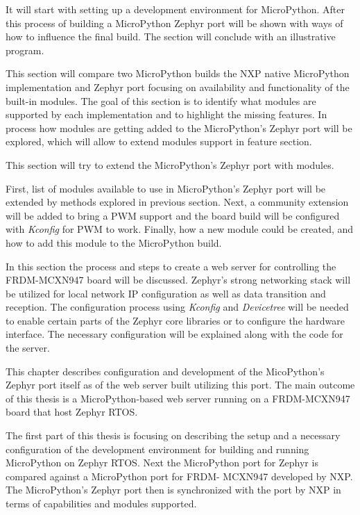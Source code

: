 \documentclass[twoside, 12pt]{article}
\begin{document}
It will start with setting up a development environment for MicroPython. After this process 
of building a MicroPython Zephyr port will be shown with ways of how to influence the final 
build. The section will conclude with an illustrative program.

This section will compare two MicroPython builds the NXP native MicroPython implementation 
and Zephyr port focusing on availability and functionality of the built-in modules. The 
goal of this  section is to identify what modules are supported by each implementation and to 
highlight the missing features. In process how modules are getting added to the MicroPython's Zephyr port will be explored, which will allow to extend modules support in feature section.

This section will try to extend the MicroPython's Zephyr port with modules. 

First, list of modules available to use in MicroPython's Zephyr port will be extended by 
methods explored in previous section. Next, a community extension will be added to bring a 
PWM support and the board build will be configured with \textit{Kconfig} for PWM to work. Finally, how a new module
could be created, and how to add this module to the MicroPython build.

In this section the process and steps to create a web server for controlling the
FRDM-MCXN947 board will be discussed. Zephyr's strong networking stack will be utilized for 
local network IP configuration as well as data transition and reception. The configuration 
process using \textit{Kconfig} and \textit{Devicetree} will be needed to enable certain 
parts of the Zephyr core libraries or to configure the hardware interface. The necessary
configuration will be explained along with the code for the server.

This chapter describes configuration and development of the MicoPython's Zephyr port itself 
as of the web server built utilizing this port. The main outcome of this thesis is a MicroPython-based web server running on a FRDM-MCXN947 board that host Zephyr RTOS.

The first part of this thesis is focusing on describing the setup and a necessary 
configuration of the development environment for building and running MicroPython on Zephyr 
RTOS. Next the MicroPython port for Zephyr is compared against a MicroPython port for FRDM-
MCXN947  developed by NXP. The MicroPython's Zephyr port then is synchronized with the port 
by NXP in terms of capabilities and modules supported.
\end{document}
